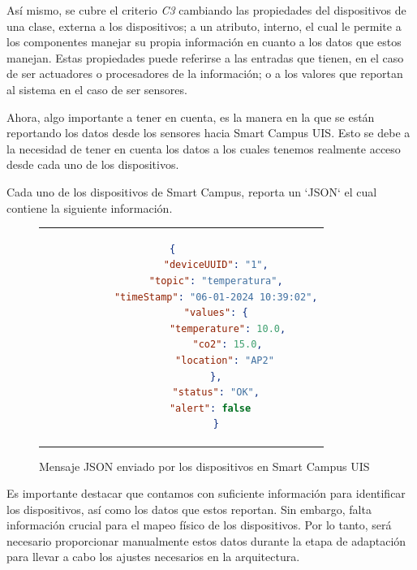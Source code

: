 Así mismo, se cubre el criterio \textit{C3} cambiando las propiedades del dispositivos de una clase, externa a los dispositivos; a un atributo, interno, el cual le permite a los componentes manejar su propia información en cuanto a los datos que estos manejan. Estas propiedades puede referirse a las entradas que tienen, en el caso de ser actuadores o procesadores de la información; o a los valores que reportan al sistema en el caso de ser sensores.

Ahora, algo importante a tener en cuenta, es la manera en la que se están reportando los datos desde los sensores hacia Smart Campus UIS. Esto se debe a la necesidad de tener en cuenta los datos a los cuales tenemos realmente acceso desde cada uno de los dispositivos.

Cada uno de los dispositivos de Smart Campus, reporta un `JSON` el cual contiene la siguiente información.

\begin{figure}[H]
    \centering
    \caption{Mensaje JSON enviado por los dispositivos en Smart Campus UIS }
    \cite{SmartCampusGithub}
    \label{fig:jsonSCU}
    \begin{tabular}{c}
        \setstretch{1}
        \small
        \begin{lstlisting}[language=Json]
            {   
            "deviceUUID": "1",
            "topic": "temperatura",
            "timeStamp": "06-01-2024 10:39:02",
            "values": {
                "temperature": 10.0,
                "co2": 15.0,
                "location": "AP2" 
            },
            "status": "OK",
            "alert": false  
            }
        \end{lstlisting}
    \end{tabular}
\end{figure}

Es importante destacar que contamos con suficiente información para identificar los dispositivos, así como los datos que estos reportan. Sin embargo, falta información crucial para el mapeo físico de los dispositivos. Por lo tanto, será necesario proporcionar manualmente estos datos durante la etapa de adaptación para llevar a cabo los ajustes necesarios en la arquitectura.


